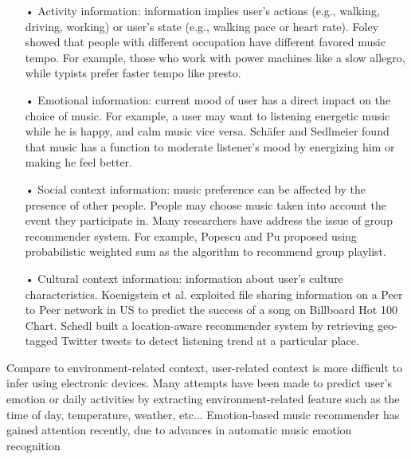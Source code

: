\begin{itemize}
\item[•] Activity information: information implies user's actions (e.g., walking, driving, working) or user's state (e.g., walking pace or heart rate). Foley \cite{foley1940occupational} showed that people with different occupation have different favored music tempo. For example, those who work with power machines like a slow allegro, while typists prefer faster tempo like presto. 
\item[•] Emotional information: current mood of user has a direct impact on the choice of music. For example, a user may want to listening energetic music while he is happy, and calm music vice versa. Sch{\"a}fer and Sedlmeier \cite{schafer2009functions} found that music has a function to moderate listener's mood by energizing him or making he feel better.
\item[•] Social context information: music preference can be affected by the presence of other people. People may choose music taken into account the event they participate in. Many researchers have address the issue of group recommender system. For example, Popescu and Pu \cite{popescu2011probabilistic} proposed using probabilistic weighted sum as the algorithm to recommend group playlist.
\item[•] Cultural context information: information about user's culture characteristics. Koenigstein et al. \cite{koenigstein2009predicting} exploited file sharing information on a Peer to Peer network in US to predict the success of a song on Billboard Hot 100 Chart. Schedl \cite{schedl2013leveraging} built a location-aware recommender system by retrieving geo-tagged Twitter tweets to detect listening trend at a particular place. 
\end{itemize}

Compare to environment-related context, user-related context is more difficult to infer using electronic devices. Many attempts have been made to predict user's emotion or daily activities \cite{park2006context} \cite{wang2012context} by extracting environment-related feature such as the time of day, temperature, weather, etc... Emotion-based music recommender has gained attention recently, due to advances in automatic music emotion recognition \cite{yang2012machine}




